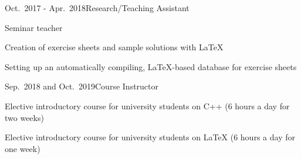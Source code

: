 \documentclass[a4paper,10pt]{cv}
\begin{document}
      \begin{cvTimeItem}{Oct.~2017 - Apr.~2018}{Research/Teaching Assistant}
        \begin{cvItemize}
          \item Seminar teacher 
          \item Creation of exercise sheets and sample solutions with LaTeX
          \item Setting up an automatically compiling, LaTeX-based database for exercise sheets
        \end{cvItemize}
      \end{cvTimeItem}
      \begin{cvTimeItem}{Sep.~2018 and Oct.~2019}{Course Instructor}
        \begin{cvItemize}
          \item Elective introductory course for university students on C++ (6 hours a day for two weeks)
          \item Elective introductory course for university students on LaTeX (6 hours a day for one week)
        \end{cvItemize}
      \end{cvTimeItem}
\end{document}
